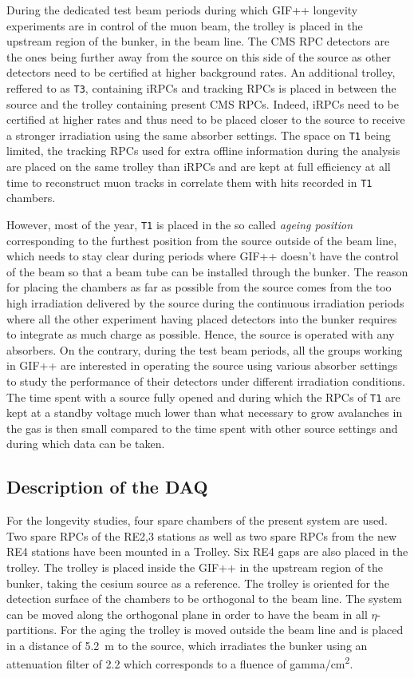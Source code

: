 	During the dedicated test beam periods during which GIF++ longevity experiments are in control of the muon beam, the trolley is placed in the upstream region of the bunker, in the beam line. The CMS RPC detectors are the ones being further away from the source on this side of the source as other detectors need to be certified at higher background rates. An additional trolley, reffered to as \texttt{T3}, containing iRPCs and tracking RPCs is placed in between the source and the trolley containing present CMS RPCs. Indeed, iRPCs need to be certified at higher rates and thus need to be placed closer to the source to receive a stronger irradiation using the same absorber settings. The space on \texttt{T1} being limited, the tracking RPCs used for extra offline information during the analysis are placed on the same trolley than iRPCs and are kept at full efficiency at all time to reconstruct muon tracks in correlate them with hits recorded in \texttt{T1} chambers.
	
	However, most of the year, \texttt{T1} is placed in the so called \textit{ageing position} corresponding to the furthest position from the source outside of the beam line, which needs to stay clear during periods where GIF++ doesn't have the control of the beam so that a beam tube can be installed through the bunker. The reason for placing the chambers as far as possible from the source comes from the too high irradiation delivered by the source during the continuous irradiation periods where all the other experiment having placed detectors into the bunker requires to integrate as much charge as possible. Hence, the source is operated with any absorbers. On the contrary, during the test beam periods, all the groups working in GIF++ are interested in operating the source using various absorber settings to study the performance of their detectors under different irradiation conditions. The time spent with a source fully opened and during which the RPCs of \texttt{T1} are kept at a standby voltage much lower than what necessary to grow avalanches in the gas is then small compared to the time spent with other source settings and during which data can be taken.

	\subsection{Description of the \acl{DAQ}}
	\label{chapt5:ssec:GIF++DAQ}

	For the longevity studies, four spare chambers of the present system are used. Two spare RPCs of the RE2,3 stations as well as two spare RPCs from the new RE4 stations have been mounted in a Trolley. Six RE4 gaps are also placed in the trolley. The trolley is placed inside the GIF++ in the upstream region of the bunker, taking the cesium source as a reference. The trolley is oriented for the detection surface of the chambers to be orthogonal to the beam line. The system can be moved along the orthogonal plane in order to have the beam in all $\eta$-partitions. For the aging the trolley is moved outside the beam line and is placed in a distance of \SI{5.2}{m} to the source, which irradiates the bunker using an attenuation filter of 2.2 which corresponds to a fluence of \si{gamma/cm\squared}.
	
